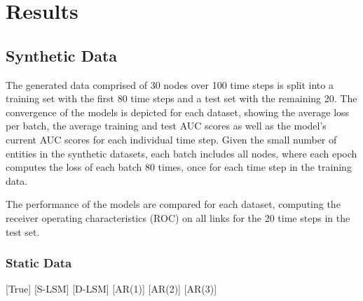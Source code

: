 \chapter{Results}\label{ch:Results}

\section{Synthetic Data}

The generated data comprised of 30 nodes over 100 time steps is split into a training set with the first 80 time steps and a test set with the remaining 20. 
The convergence of the models is depicted for each dataset, showing the average loss per batch, the average training and test AUC scores as well as the model's current AUC scores for each individual time step. 
Given the small number of entities in the synthetic datasets, each batch includes all nodes, where each epoch computes the loss of each batch 80 times, once for each time step in the training data. 


The performance of the models are compared for each dataset, computing the receiver operating characteristics (ROC) on all links for the 20 time steps in the test set.

\subsection{Static Data}

    
    \xhex
    {[True]}
    {[S-LSM]}
    {[D-LSM]}
    {[AR(1)]}
    {[AR(2)]}
    {[AR(3)]}

